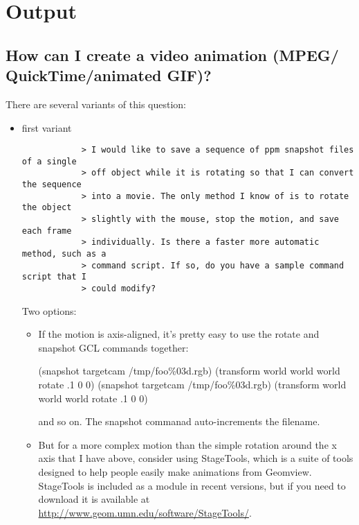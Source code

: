 \documentclass[12pt,a4paper]{article}
\begin{document}
\section{Output}

    \subsection{How can I create a video animation (MPEG/\\ QuickTime/animated GIF)?}

There are several variants of this question:

        \begin{itemize}

        \item first variant \\
    	    \tiny
    	    \begin{verbatim}
            > I would like to save a sequence of ppm snapshot files of a single
            > off object while it is rotating so that I can convert the sequence
            > into a movie. The only method I know of is to rotate the object
            > slightly with the mouse, stop the motion, and save each frame
            > individually. Is there a faster more automatic method, such as a
            > command script. If so, do you have a sample command script that I
            > could modify?
	    \end{verbatim}
	    \normalsize
            Two options:
              \begin{itemize}
              \item If the motion is axis-aligned, it's pretty easy to use the
                rotate and snapshot GCL commands together:

                (snapshot targetcam /tmp/foo\%03d.rgb)
                (transform world world world rotate .1 0 0)
                (snapshot targetcam /tmp/foo\%03d.rgb)
                (transform world world world rotate .1 0 0)

                and so on. The snapshot commanad auto-increments the filename.

              \item But for a more complex motion than the simple rotation around
                the x axis that I have above, consider using StageTools, which
                is a suite of tools designed to help people easily make
                animations from Geomview. StageTools is included as a module in
                recent versions, but if you need to download it is available at
                \url{http://www.geom.umn.edu/software/StageTools/}.
              \end{itemize}


\end{itemize}
\end{document}
